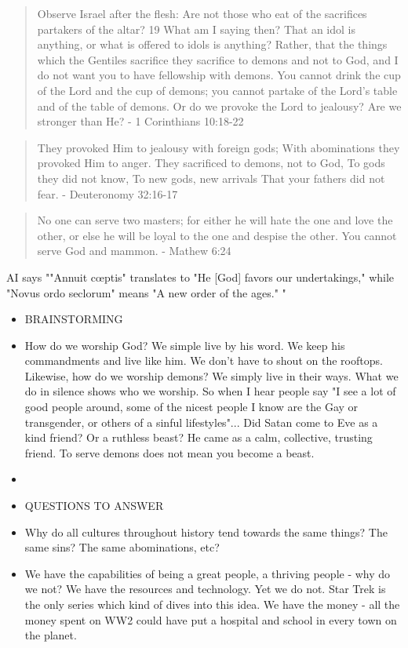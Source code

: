 \documentclass[10pt]{article}
\begin{document}
\begin{multicols}{2}
\begin{quotation}
Observe Israel after the flesh: Are not those who eat of the sacrifices partakers of the altar? 19 What am I saying then? That an idol is anything, or what is offered to idols is anything? Rather, that the things which the Gentiles sacrifice they sacrifice to demons and not to God, and I do not want you to have fellowship with demons. You cannot drink the cup of the Lord and the cup of demons; you cannot partake of the Lord’s table and of the table of demons. Or do we provoke the Lord to jealousy? Are we stronger than He? - 1 Corinthians 10:18-22
\end{quotation}

\begin{quotation}
They provoked Him to jealousy with foreign gods;
With abominations they provoked Him to anger.
They sacrificed to demons, not to God,
To gods they did not know,
To new gods, new arrivals
That your fathers did not fear. - Deuteronomy 32:16-17
\end{quotation}

\begin{quotation}
No one can serve two masters; for either he will hate the one and love the other, or else he will be loyal to the one and despise the other. You cannot serve God and mammon. - Mathew 6:24
\end{quotation}

AI says ""Annuit cœptis" translates to "He [God] favors our undertakings," while "Novus ordo seclorum" means "A new order of the ages." "

\begin{itemize}
\item BRAINSTORMING
\item How do we worship God? We simple live by his word. We keep his commandments and live like him. We don't have to shout on the rooftops. Likewise, how do we worship demons? We simply live in their ways. What we do in silence shows who we worship. So when I hear people say "I see a lot of good people around, some of the nicest people I know are the Gay or transgender, or others of a sinful lifestyles"... Did Satan come to Eve as a kind friend? Or a ruthless beast? He came as a calm, collective, trusting friend. To serve demons does not mean you become a beast.
\item
\end{itemize}

\begin{itemize}
\item QUESTIONS TO ANSWER
\item Why do all cultures throughout history tend towards the same things? The same sins? The same abominations, etc?
\item We have the capabilities of being a great people, a thriving people - why do we not? We have the resources and technology. Yet we do not. Star Trek is the only series which kind of dives into this idea. We have the money - all the money spent on WW2 could have put a hospital and school in every town on the planet.
\end{itemize}






\end{multicols}
\end{document}
